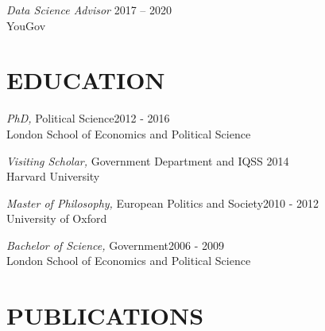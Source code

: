 \documentclass[centered]{res}
\begin{document}
\begin{resume}
{\sl Data Science Advisor} \hfill 2017 -- 2020\\
YouGov


\section{EDUCATION} 

\vspace{.5cm}

		{\sl PhD,} Political Science\hfill 2012 - 2016\\
                London School of Economics and Political Science

		{\sl Visiting Scholar,} Government Department and IQSS \hfill  2014\\
                 Harvard University  

		{\sl Master of Philosophy,} European Politics and Society\hfill 2010 - 2012 \\
                University of Oxford

		{\sl Bachelor of Science,} Government\hfill 2006 - 2009 \\
                London School of Economics and Political Science

\section{PUBLICATIONS} 

\vspace{.5cm}



\end{resume}
\end{document}
